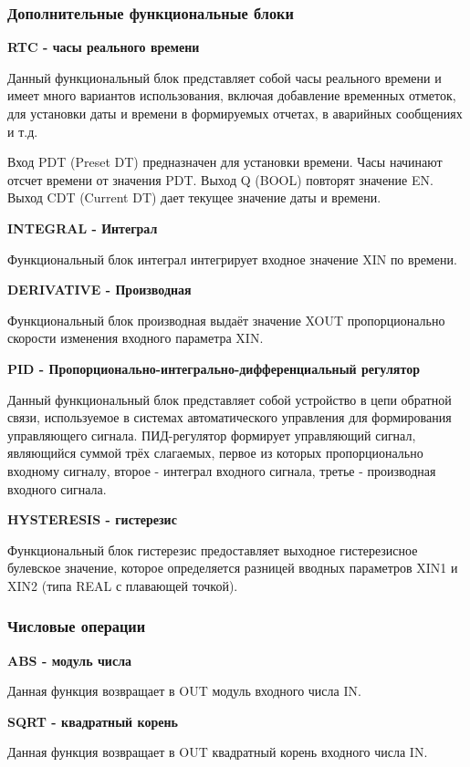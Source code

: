 \documentclass[letterpaper,10pt,russian]{sphinxmanual}
\begin{document}
\subsubsection{Дополнительные функциональные блоки}
\label{usage_guide/library:id3}
\textbf{RTC - часы реального времени}

Данный функциональный блок представляет собой часы реального времени и
имеет много вариантов использования, включая добавление временных
отметок, для установки даты и времени в формируемых отчетах, в аварийных
сообщениях и т.д.

Вход PDT (Preset DT) предназначен для установки времени. Часы начинают
отсчет времени от значения PDT. Выход Q (BOOL) повторят значение EN.
Выход CDT (Current DT) дает текущее значение даты и времени.

\textbf{INTEGRAL - Интеграл}

Функциональный блок интеграл интегрирует входное значение XIN по
времени.

\textbf{DERIVATIVE - Производная}

Функциональный блок производная выдаёт значение XOUT пропорционально
скорости изменения входного параметра XIN.

\textbf{PID - Пропорционально-интегрально-дифференциальный регулятор}

Данный функциональный блок представляет собой устройство в цепи обратной
связи, используемое в системах автоматического управления для
формирования управляющего сигнала. ПИД-регулятор формирует управляющий
сигнал, являющийся суммой трёх слагаемых, первое из которых
пропорционально входному сигналу, второе - интеграл входного сигнала,
третье - производная входного сигнала.

\textbf{HYSTERESIS - гистерезис}

Функциональный блок гистерезис предоставляет выходное гистерезисное
булевское значение, которое определяется разницей вводных параметров
XIN1 и XIN2 (типа REAL с плавающей точкой).


\subsubsection{Числовые операции}
\label{usage_guide/library:id4}
\textbf{ABS - модуль числа}

Данная функция возвращает в OUT модуль входного числа IN.

\textbf{SQRT - квадратный корень}

Данная функция возвращает в OUT квадратный корень входного числа IN.
\end{document}
